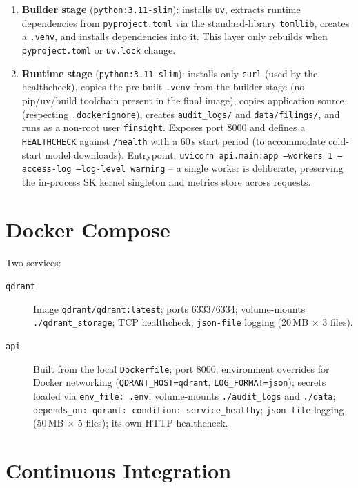 \documentclass[11pt,a4paper]{report}
\newcommand{\code}[1]{\texttt{#1}}
\newcommand{\file}[1]{\texttt{\small #1}}
\begin{document}
\begin{enumerate}
    \item \textbf{Builder stage} (\code{python:3.11-slim}): installs \code{uv},
    extracts runtime dependencies from \file{pyproject.toml} via the standard-library
    \code{tomllib}, creates a \code{.venv}, and installs dependencies into it. This
    layer only rebuilds when \file{pyproject.toml} or \file{uv.lock} change.
    \item \textbf{Runtime stage} (\code{python:3.11-slim}): installs only
    \code{curl} (used by the healthcheck), copies the pre-built \code{.venv} from the
    builder stage (no pip/uv/build toolchain present in the final image), copies
    application source (respecting \file{.dockerignore}), creates
    \file{audit\_logs/} and \file{data/filings/}, and runs as a non-root user
    \code{finsight}. Exposes port 8000 and defines a \code{HEALTHCHECK} against
    \code{/health} with a 60\,s start period (to accommodate cold-start model
    downloads). Entrypoint: \code{uvicorn api.main:app --workers 1 --access-log
    --log-level warning} -- a single worker is deliberate, preserving the in-process
    SK kernel singleton and metrics store across requests.
\end{enumerate}

\section{Docker Compose}

Two services:

\begin{description}
    \item[\code{qdrant}] Image \code{qdrant/qdrant:latest}; ports 6333/6334;
    volume-mounts \file{./qdrant\_storage}; TCP healthcheck; \code{json-file} logging
    (20\,MB $\times$ 3 files).
    \item[\code{api}] Built from the local \code{Dockerfile}; port 8000; environment
    overrides for Docker networking (\code{QDRANT\_HOST=qdrant},
    \code{LOG\_FORMAT=json}); secrets loaded via \code{env\_file: .env};
    volume-mounts \file{./audit\_logs} and \file{./data};
    \code{depends\_on: qdrant: condition: service\_healthy}; \code{json-file} logging
    (50\,MB $\times$ 5 files); its own HTTP healthcheck.
\end{description}

\section{Continuous Integration}
\end{document}
